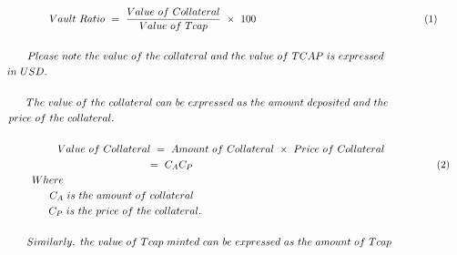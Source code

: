 {\begin{gather}
 \notag\\
\ \ \ \ \ \ \ \ \ \ \ \ \ Vault\ Ratio\ =\ \frac{Value\ of\ Collateral}{Value\ of\ Tcap} \ \times \ 100\ \ \ \ \ \ \ \ \ \ \ \ \ \ \ \ \ \ \ \ \ \ \ \ \ \ \ \ \ \ \ \ \ \ \ \ \ \ \ \ \ \ \ \ \ \ \ \ \ ( 1)\\
 \notag\\
Please\ note\ the\ value\ of\ the\ collateral\ and\ the\ value\ of\ TCAP\ is\ expressed\ \ \ \ \ \ \ \ \  \notag\\
in\ USD.\ \ \ \ \ \ \ \ \ \ \ \ \ \ \ \ \ \ \ \ \ \ \ \ \ \ \ \ \ \ \ \ \ \ \ \ \ \ \ \ \ \ \ \ \ \ \ \ \ \ \ \ \ \ \ \ \ \ \ \ \ \ \ \ \ \ \ \ \ \ \ \ \ \ \ \ \ \ \ \ \ \ \ \ \ \ \ \ \ \ \ \ \ \ \ \ \ \ \ \ \ \ \ \ \ \ \ \ \ \ \ \ \  \notag\\
 \notag\\
The\ value\ of\ the\ collateral\ can\ be\ expressed\ as\ the\ amount\ deposited\ and\ the\ \ \ \ \ \ \ \  \notag\\
price\ of\ the\ collateral.\ \ \ \ \ \ \ \ \ \ \ \ \ \ \ \ \ \ \ \ \ \ \ \ \ \ \ \ \ \ \ \ \ \ \ \ \ \ \ \ \ \ \ \ \ \ \ \ \ \ \ \ \ \ \ \ \ \ \ \ \ \ \ \ \ \ \ \ \ \ \ \ \ \ \ \ \ \ \ \ \ \ \ \ \ \ \ \ \ \ \ \ \  \notag\\
 \notag\\
Value\ of\ Collateral\ =\ Amount\ of\ Collateral\ \times \ Price\ of\ Collateral \notag\\
\ \ \ \ \ \ \ \ \ \ \ \ \ \ \ \ \ \ \ \ \ \ \ \ \ \ \ \ \ \ \ \ \ \ \ \ \ \ \ \ \ \ \ \ \ \ =\ C_{A} C_{P} \ \ \ \ \ \ \ \ \ \ \ \ \ \ \ \ \ \ \ \ \ \ \ \ \ \ \ \ \ \ \ \ \ \ \ \ \ \ \ \ \ \ \ \ \ \ \ \ \ \ \ \ \ \ \ \ \ \ \ \ \ \ \ \ \ \ \ \ \ \ \ ( 2)\\
\ \ \ \ \ \ \ \ Where\ \ \ \ \ \ \ \ \ \ \ \ \ \ \ \ \ \ \ \ \ \ \ \ \ \ \ \ \ \ \ \ \ \ \ \ \ \ \ \ \ \ \ \ \ \ \ \ \ \ \ \ \ \ \ \ \ \ \ \ \ \ \ \ \ \ \ \ \ \ \ \ \ \ \ \ \ \ \ \ \ \ \ \ \ \ \ \ \ \ \ \ \ \ \ \ \ \ \ \ \ \ \ \ \ \ \ \ \  \notag\\
\ \ \ \ \ \ \ \ \ C_{A} \ is\ the\ amount\ of\ collateral\ \ \ \ \ \ \ \ \ \ \ \ \ \ \ \ \ \ \ \ \ \ \ \ \ \ \ \ \ \ \ \ \ \ \ \ \ \ \ \ \ \ \ \ \ \ \ \ \ \ \ \ \ \ \ \ \ \ \ \ \ \ \ \ \ \ \  \notag\\
\ \ \ \ \ \ \ \ \ C_{P} \ is\ the\ price\ of\ the\ collateral.\ \ \ \ \ \ \ \ \ \ \ \ \ \ \ \ \ \ \ \ \ \ \ \ \ \ \ \ \ \ \ \ \ \ \ \ \ \ \ \ \ \ \ \ \ \ \ \ \ \ \ \ \ \ \ \ \ \ \ \ \ \ \ \ \  \notag\\
 \notag\\
Similarly,\ the\ value\ of\ Tcap\ minted\ can\ be\ expressed\ as\ the\ amount\ of\ Tcap\ \ \ \ \ \ \  \notag\\

\end{gather}}
